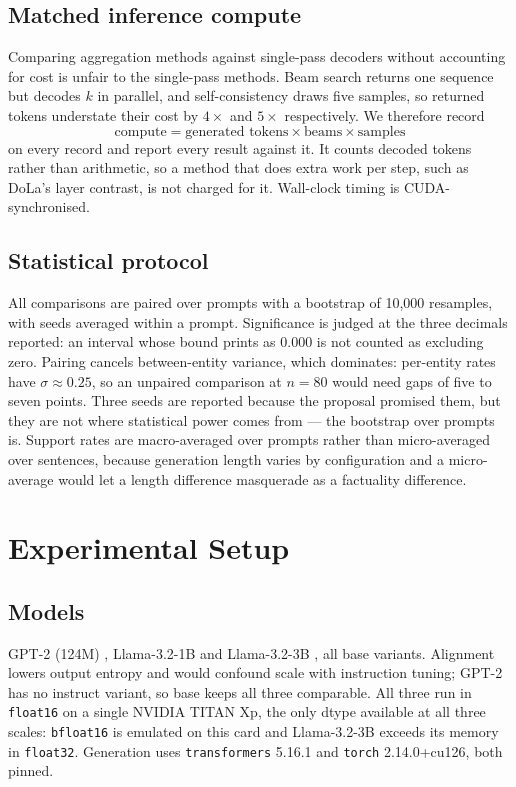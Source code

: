 \documentclass[11pt]{article}
\begin{document}
\subsection{Matched inference compute}

Comparing aggregation methods against single-pass decoders without accounting
for cost is unfair to the single-pass methods. Beam search returns one sequence
but decodes $k$ in parallel, and self-consistency draws five samples, so
returned tokens understate their cost by $4\times$ and $5\times$ respectively.
We therefore record
\[
\text{compute} = \text{generated tokens} \times \text{beams} \times \text{samples}
\]
on every record and report every result against it. It counts decoded tokens
rather than arithmetic, so a method that does extra work per step, such as
DoLa's layer contrast, is not charged for it. Wall-clock timing is
CUDA-synchronised.

\subsection{Statistical protocol}

All comparisons are paired over prompts with a bootstrap of 10{,}000 resamples,
with seeds averaged within a prompt. Significance is judged at the three
decimals reported: an interval whose bound prints as $0.000$ is not counted as
excluding zero. Pairing cancels between-entity variance, which dominates:
per-entity rates have $\sigma \approx 0.25$, so an unpaired comparison at
$n=80$ would need gaps of five to seven points. Three seeds are reported
because the proposal promised them, but they are not where statistical power
comes from --- the bootstrap over prompts is. Support rates are macro-averaged
over prompts rather than micro-averaged over sentences, because generation
length varies by configuration and a micro-average would let a length
difference masquerade as a factuality difference.

\section{Experimental Setup}

\subsection{Models}

GPT-2 (124M) \citep{radford2019gpt2}, Llama-3.2-1B and Llama-3.2-3B
\citep{llama3}, all base variants. Alignment lowers output entropy and would
confound scale with instruction tuning; GPT-2 has no instruct variant, so base
keeps all three comparable. All three run in \texttt{float16} on a single
NVIDIA TITAN Xp, the only dtype available at all three scales:
\texttt{bfloat16} is emulated on this card and Llama-3.2-3B exceeds its memory
in \texttt{float32}. Generation uses \texttt{transformers} 5.16.1 and
\texttt{torch} 2.14.0+cu126, both pinned.
\end{document}
